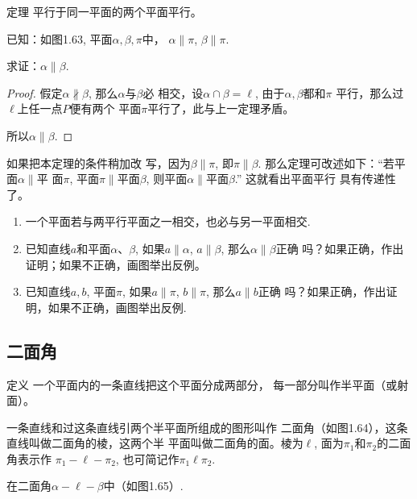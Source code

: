 \begin{blk}
  {定理} 平行于同一平面的两个平面平行。
\end{blk}


已知：如图1.63, 平面$\alpha,\beta,\pi$中，
$\alpha\parallel \pi$, $\beta\parallel \pi$.

求证：$\alpha\parallel \beta$.

\begin{proof}
  假定$\alpha\nparallel\beta$, 那么$\alpha$与$\beta$必
相交，设$\alpha\cap \beta=\ell$, 由于$\alpha,\beta$都和$\pi$
平行，那么过$\ell$上任一点$P$便有两个
平面$\pi$平行了，此与上一定理矛盾。

所以$\alpha\parallel \beta$.
\end{proof}

\begin{rmk}
如果把本定理的条件稍加改
写，因为$\beta\parallel \pi$, 即$\pi\parallel \beta$. 那么定理可改述如下：“若平面$\alpha\parallel$平
面$\pi$, 平面$\pi\parallel$平面$\beta$, 则平面$\alpha\parallel$平面$\beta$.” 这就看出平面平行
具有传递性了。
\end{rmk}

\begin{ex}
\begin{enumerate}
  \item 一个平面若与两平行平面之一相交，也必与另一平面相交.
  \item 已知直线$a$和平面$\alpha$、$\beta$, 如果$a\parallel \alpha$, $a\parallel \beta$, 那么$\alpha\parallel \beta$正确
  吗？如果正确，作出证明；如果不正确，画图举出反例。
  \item 已知直线$a,b$, 平面$\pi$, 如果$a\parallel \pi$, $b\parallel \pi$, 那么$a\parallel b$正确
  吗？如果正确，作出证明，如果不正确，画图举出反例.
\end{enumerate}
\end{ex}

\subsection{二面角}
\begin{blk}
  {定义} 一个平面内的一条直线把这个平面分成两部分，
每一部分叫作半平面（或射面）。
\end{blk}

一条直线和过这条直线引两个半平面所组成的图形叫作
二面角（如图1.64），这条直线叫做二面角的棱，这两个半
平面叫做二面角的面。棱为$\ell$, 面为$\pi_1$和$\pi_2$的二面角表示作
$\pi_1-\ell-\pi_2$, 也可简记作$\pi_1\ell\pi_2$.

在二面角$\alpha-\ell-\beta$中（如图1.65）.

